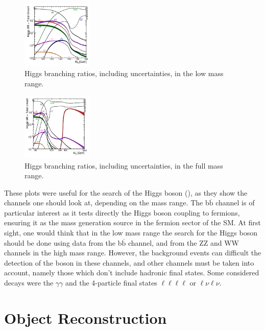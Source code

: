 \documentclass[EPJ,twocolumn]{webofc}
\begin{document}
\begin{figure}[H]
\centering
\sidecaption
\includegraphics[width=0.3\textwidth,clip]{img/lowmassrange.png}
\caption{Higgs branching ratios, including uncertainties, in the low mass range.}
\label{higgsbr1}       
\end{figure}

\begin{figure}[H]
\centering
\sidecaption
\includegraphics[width=0.3\textwidth,clip]{img/fullmassrange.png}
\caption{Higgs branching ratios, including uncertainties, in the full mass range.}
\label{higgsbr2}       
\end{figure}

These plots were useful for the search of the Higgs boson (\cite{bworld}), as they show the channels one should look at, depending on the mass range.
The b$\overline{\text{b}}$ channel is of particular interest as it tests directly the Higgs boson coupling to fermions, ensuring it as the mass generation source in the fermion sector of the SM.
At first sight, one would think that in the low mass range the search for the Higgs boson should be done using data from the b$\overline{\text{b}}$ channel, and from the ZZ and WW channels in the high mass range. However, the background events can difficult the detection of the boson in these channels, and other channels must be taken into account, namely those which don't include hadronic final states. Some considered decays were the $\gamma\gamma$ and the 4-particle final states $\ell \ell \ell \ell $ or $\ell \nu \ell \nu$.


\section{Object Reconstruction}
\end{document}
